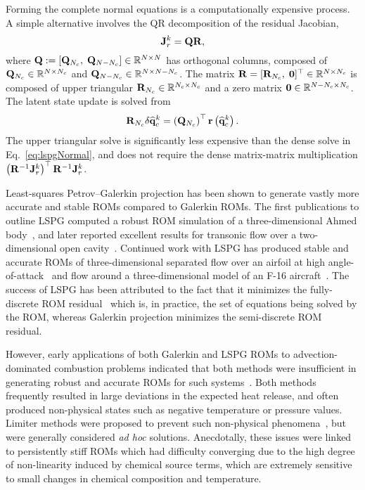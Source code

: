Forming the complete normal equations is a computationally expensive process. A simple alternative involves the QR decomposition of the residual Jacobian, 
%
\begin{equation}
    \mathbf{J}_{r}^{k} = \mathbf{QR},
\end{equation}
%
where $\mathbf{Q} := \left[\mathbf{Q}_{N_c}, \; \mathbf{Q}_{N-N_c}\right] \in \mathbb{R}^{N \times N}$ has orthogonal columns, composed of $\mathbf{Q}_{N_c} \in \mathbb{R}^{N \times N_c}$ and $\mathbf{Q}_{N - N_c} \in \mathbb{R}^{N \times N - N_c}$. The matrix $\mathbf{R} = [\mathbf{R}_{N_c}, \; \mathbf{0}]^\top \in \mathbb{R}^{N \times N_c}$ is composed of upper triangular $\mathbf{R}_{N_c} \in \mathbb{R}^{N_c \times N_c}$ and a zero matrix $\mathbf{0} \in \mathbb{R}^{N - N_c \times N_c}$. The latent state update is solved from
%
\begin{equation}
    \mathbf{R}_{N_c} \delta \mathbf{\widehat{q}}_{c}^{k} = \left(\mathbf{Q}_{N_c}\right)^\top \mathbf{r}\left(\mathbf{\widehat{q}}_{c}^{k}\right).
\end{equation}
%
The upper triangular solve is significantly less expensive than the dense solve in Eq.~\ref{eq:lspgNormal}, and does not require the dense matrix-matrix multiplication $\left(\resScaleInv \jacobRes^{\newtonIdx}\right)^\top \resScaleInv \jacobRes^{\newtonIdx}$.

Least-squares Petrov--Galerkin projection has been shown to generate vastly more accurate and stable ROMs compared to Galerkin ROMs. The first publications to outline LSPG computed a robust ROM simulation of a three-dimensional Ahmed body~\cite{Carlberg2010,Carlberg2013}, and later reported excellent results for transonic flow over a two-dimensional open cavity~\cite{Carlberg2017}. Continued work with LSPG has produced stable and accurate ROMs of three-dimensional separated flow over an airfoil at high angle-of-attack~\cite{Grimberg2020Hyper} and flow around a three-dimensional model of an F-16 aircraft~\cite{Grimberg2021}. The success of LSPG has been attributed to the fact that it minimizes the fully-discrete ROM residual~\cite{Grimberg2020} which is, in practice, the set of equations being solved by the ROM, whereas Galerkin projection minimizes the semi-discrete ROM residual.

However, early applications of both Galerkin and LSPG ROMs to advection-dominated combustion problems indicated that both methods were insufficient in generating robust and accurate ROMs for such systems~\cite{Huang2018b,Huang2019}. Both methods frequently resulted in large deviations in the expected heat release, and often produced non-physical states such as negative temperature or pressure values. Limiter methods were proposed to prevent such non-physical phenomena~\cite{Huang2019,Huang2020}, but were generally considered \textit{ad hoc} solutions. Anecdotally, these issues were linked to persistently stiff ROMs which had difficulty converging due to the high degree of non-linearity induced by chemical source terms, which are extremely sensitive to small changes in chemical composition and temperature. 